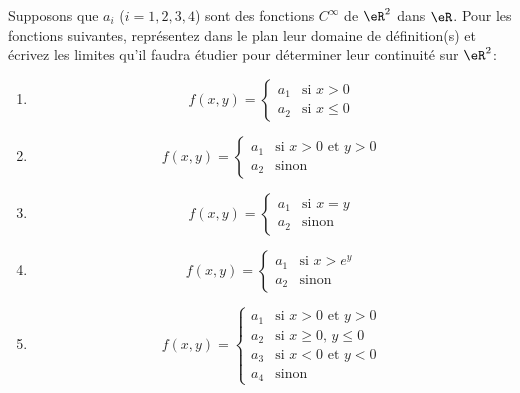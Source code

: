 
\begin{exercice}\label{exoLimSup0001}

	Supposons que $a_i$ ($i=1,2,3,4$) sont des fonctions $C^\infty$ de $\eR^2$ dans $\eR$. Pour les fonctions suivantes, représentez dans le plan leur domaine de définition(s) et écrivez les limites qu'il faudra étudier pour déterminer leur continuité sur $\eR^2$:

\begin{multicols}{2}
	\begin{enumerate}
	\item 
	\begin{equation}
		f(x,y)=
			\begin{cases}
		a_1	&	\text{si $x>0$}\\
		a_2	&	 \text{si $x\leq 0$}
	\end{cases}
	\end{equation}

	\item 
	\begin{equation}
		f(x,y)=
			\begin{cases}
		a_1	&	\text{si $x>0$ et $y>0$}\\
		a_2	&	 \text{sinon}
	\end{cases}
	\end{equation}

	\item 
	\begin{equation}
		f(x,y)=
			\begin{cases}
		a_1	&	\text{si $x=y$}\\
		a_2	&	 \text{sinon}
	\end{cases}
	\end{equation}

	\item 
	\begin{equation}
		f(x,y)=
			\begin{cases}
		a_1	&	\text{si $x> e^{y}$}\\
		a_2	&	 \text{sinon}
	\end{cases}
	\end{equation}

	\item 
	\begin{equation}
		f(x,y)=
			\begin{cases}
		a_1	&	\text{si $x>0$ et $y>0$}\\
		a_2	&	 \text{si $x\geq 0$, $y\leq 0$}\\
		a_3	&	 \text{si $x<0$ et $y<0$}\\
		a_4	&	 \text{sinon}
	\end{cases}
	\end{equation}


\end{enumerate}
\end{multicols}
\end{exercice}
